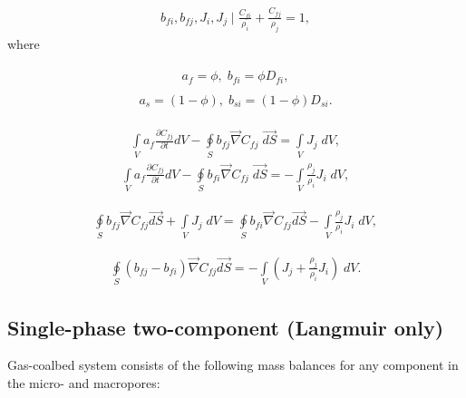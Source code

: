\documentclass[a4paper,14pt,english]{extreport}
\begin{document}
\begin{eqnarray}
\label{eq:multiphase_diffusivity_densities}
b_{fi}, b_{fj}, J_{i}, J_{j} \mid \frac{C_{fi}}{\rho_i} + \frac{C_{fj}}{\rho_j} = 1,
\end{eqnarray}
where 

\begin{eqnarray}
\label{eq:multiphase_diffusivity_a_b_coeffs_free}
\begin{gathered}
a_{f} = \phi, \; b_{fi} = \phi D_{fi},
\end{gathered}
\end{eqnarray}
\begin{eqnarray}
\label{eq:multiphase_diffusivity_a_b_coeffs_adsorbed}
\begin{gathered}
a_{s} = \left(1-\phi\right), \; b_{si} = \left(1-\phi\right) D_{si}.
\end{gathered}
\end{eqnarray}

\begin{eqnarray}
\label{eq:multiphase_diffusivity_simplified_integral}
\int \limits_{V} a_{f} \frac{\partial C_{fj}}{\partial t} dV - \oint \limits_{S} b_{fj} \vec{\nabla}C_{fj} \; \vec{dS} = \int \limits_{V} J_{j} \; dV,
\end{eqnarray}
\begin{eqnarray}
\label{eq:multiphase_diffusivity_simplified_integral}
\int \limits_{V} a_{f} \frac{\partial C_{fj}}{\partial t} dV - \oint \limits_{S} b_{fi} \vec{\nabla}C_{fj} \; \vec{dS} = -\int \limits_{V} \frac{\rho_j}{\rho_i}J_{i} \; dV,
\end{eqnarray}

\begin{eqnarray}
\label{eq:multiphase_diffusivity_simplified_integral}
\oint \limits_{S} b_{fj} \vec{\nabla}C_{fj} \vec{dS}
 + \int \limits_{V} J_{j} \; dV
 = \oint \limits_{S} b_{fi} \vec{\nabla}C_{fj} \vec{dS}
 -\int \limits_{V} \frac{\rho_j}{\rho_i}J_{i} \; dV,
\end{eqnarray}

\begin{eqnarray}
\label{eq:multiphase_diffusivity_simplified_integral}
\oint \limits_{S} \left(b_{fj}-b_{fi}\right) \vec{\nabla}C_{fj} \vec{dS}
= -\int \limits_{V} \left(J_{j}+\frac{\rho_j}{\rho_i}J_{i}\right) \; dV.
\end{eqnarray}

 \subsection*{Single-phase two-component (Langmuir only)}
Gas-coalbed system consists of the following mass balances for any component in the micro- and macropores:
\end{document}
